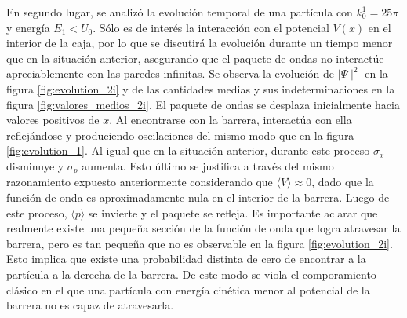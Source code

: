 \documentclass[aps,prb,twocolumn,superscriptaddress,floatfix,longbibliography]{revtex4-2}
\begin{document}
En segundo lugar, se analizó la evolución temporal de una partícula con $k_0^1 = 25 \pi$ y energía $E_1<U_0$. Sólo es de interés la interacción con el potencial $V(x)$ en el interior de la caja, por lo que se discutirá la evolución durante un tiempo menor que en la situación anterior, asegurando que el paquete de ondas no interactúe apreciablemente con las paredes infinitas. Se observa la evolución de $\mid \Psi \mid^2$ en la figura \ref{fig:evolution_2i} y de las cantidades medias y sus indeterminaciones en la figura \ref{fig:valores_medios_2i}. El paquete de ondas se desplaza inicialmente hacia valores positivos de $x$. Al encontrarse con la barrera, interactúa con ella reflejándose y produciendo oscilaciones del mismo modo que en la figura \ref{fig:evolution_1}. Al igual que en la situación anterior, durante este proceso $\sigma_x$ disminuye y $\sigma_p$ aumenta. Esto último se justifica a través del mismo razonamiento expuesto anteriormente considerando que $\langle V \rangle \approx 0$, dado que la función de onda es aproximadamente nula en el interior de la barrera. Luego de este proceso, $\langle p \rangle$ se invierte y el paquete se refleja. Es importante aclarar que realmente existe una pequeña sección de la función de onda que logra atravesar la barrera, pero es tan pequeña que no es observable en la figura \ref{fig:evolution_2i}. Esto implica que existe una probabilidad distinta de cero de encontrar a la partícula a la derecha de la barrera. De este modo se viola el comporamiento clásico en el que una partícula con energía cinética menor al potencial de la barrera no es capaz de atravesarla.
\end{document}
